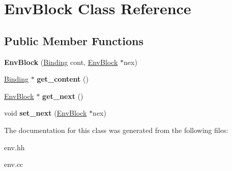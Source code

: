 \hypertarget{classEnvBlock}{\section{Env\-Block Class Reference}
\label{classEnvBlock}
}
\subsection*{Public Member Functions}
\begin{DoxyCompactItemize}
\item 
\hypertarget{classEnvBlock_a0158ee57b867427a39b8395af13629eb}{{\bfseries Env\-Block} (\hyperlink{classBinding}{Binding} cont, \hyperlink{classEnvBlock}{Env\-Block} $\ast$nex)}\label{classEnvBlock_a0158ee57b867427a39b8395af13629eb}

\item 
\hypertarget{classEnvBlock_a0860a0760290ddc69bdf14f766660c0c}{\hyperlink{classBinding}{Binding} $\ast$ {\bfseries get\-\_\-content} ()}\label{classEnvBlock_a0860a0760290ddc69bdf14f766660c0c}

\item 
\hypertarget{classEnvBlock_a03c712b1a137883e0ae303593c4c5e71}{\hyperlink{classEnvBlock}{Env\-Block} $\ast$ {\bfseries get\-\_\-next} ()}\label{classEnvBlock_a03c712b1a137883e0ae303593c4c5e71}

\item 
\hypertarget{classEnvBlock_a9c3c8875eca72db1bf042f9de83db78b}{void {\bfseries set\-\_\-next} (\hyperlink{classEnvBlock}{Env\-Block} $\ast$nex)}\label{classEnvBlock_a9c3c8875eca72db1bf042f9de83db78b}

\end{DoxyCompactItemize}


The documentation for this class was generated from the following files\-:\begin{DoxyCompactItemize}
\item 
env.\-hh\item 
env.\-cc\end{DoxyCompactItemize}
